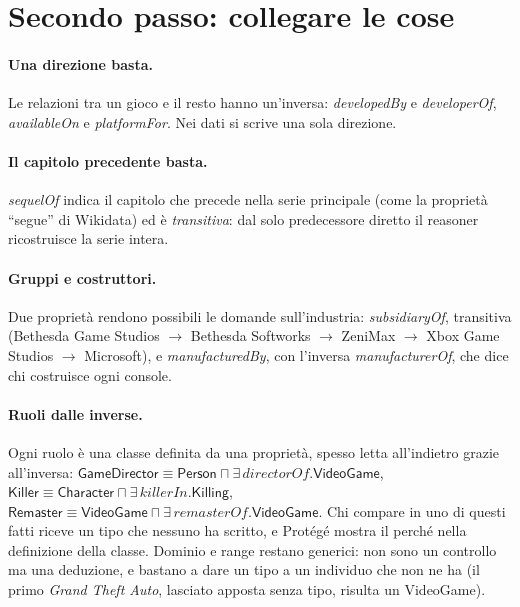 \documentclass[10pt,a4paper]{article}
\newcommand{\cls}[1]{\textsf{#1}}
\newcommand{\prop}[1]{\textit{#1}}
\begin{document}
\section{Secondo passo: collegare le cose}\label{sec:proprieta}

\paragraph{Una direzione basta.} Le relazioni tra un gioco e il resto hanno un'inversa: \prop{developedBy} e \prop{developerOf}, \prop{availableOn} e \prop{platformFor}. Nei dati si scrive una sola direzione.

\paragraph{Il capitolo precedente basta.} \prop{sequelOf} indica il capitolo che precede nella serie principale (come la proprietà ``segue'' di Wikidata) ed è \emph{transitiva}: dal solo predecessore diretto il reasoner ricostruisce la serie intera.

\paragraph{Gruppi e costruttori.} Due proprietà rendono possibili le domande sull'industria: \prop{subsidiaryOf}, transitiva (Bethesda Game Studios $\to$ Bethesda Softworks $\to$ ZeniMax $\to$ Xbox Game Studios $\to$ Microsoft), e \prop{manufacturedBy}, con l'inversa \prop{manufacturerOf}, che dice chi costruisce ogni console.

\paragraph{Ruoli dalle inverse.} Ogni ruolo è una classe definita da una proprietà, spesso letta all'indietro grazie all'inversa: $\cls{GameDirector} \equiv \cls{Person} \sqcap \exists\,\prop{directorOf}.\cls{VideoGame}$, $\cls{Killer} \equiv \cls{Character} \sqcap \exists\,\prop{killerIn}.\cls{Killing}$, $\cls{Remaster} \equiv \cls{VideoGame} \sqcap \exists\,\prop{remasterOf}.\cls{VideoGame}$. Chi compare in uno di questi fatti riceve un tipo che nessuno ha scritto, e Protégé mostra il perché nella definizione della classe. Dominio e range restano generici: non sono un controllo ma una deduzione, e bastano a dare un tipo a un individuo che non ne ha (il primo \emph{Grand Theft Auto}, lasciato apposta senza tipo, risulta un \cls{VideoGame}).
\end{document}
